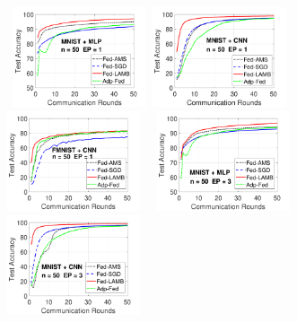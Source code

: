 \documentclass[manuscript,screen,review]{acmart}
\begin{document}
\begin{figure}[h]
    \begin{center}
        \mbox{
        \hspace{-0.1in}\includegraphics[width=0.35\textwidth]{new_fmnist_mnist_fig/mnist_testerror_mlp_ep1_iid1_reddi.pdf}
        \hspace{-0.1in}\includegraphics[width=0.35\textwidth]{new_fmnist_mnist_fig/mnist_testerror_cnn_ep1_iid1_reddi.pdf}
        \hspace{-0.1in}\includegraphics[width=0.35\textwidth]{new_fmnist_mnist_fig/fmnist_testerror_cnn_ep1_iid1_reddi.pdf}
        }
        \mbox{
        \hspace{-0.1in}\includegraphics[width=0.35\textwidth]{new_fmnist_mnist_fig/mnist_testerror_mlp_ep3_iid1_reddi.pdf}
        \hspace{-0.1in}\includegraphics[width=0.35\textwidth]{new_fmnist_mnist_fig/mnist_testerror_cnn_ep3_iid1_reddi.pdf}
}
\end{center}
\end{figure}
\end{document}
